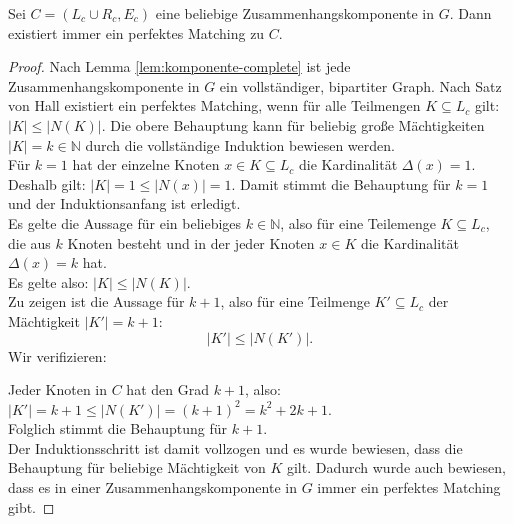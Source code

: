 \begin{lemma}\label{lem:komponente-matching}
Sei $C = (L_c \cup R_c, E_c)$ eine beliebige
Zusammenhangskomponente in $G$. Dann existiert immer ein perfektes Matching zu $C$.
\end{lemma}
\begin{proof} 
Nach Lemma \ref{lem:komponente-complete} ist jede Zusammenhangskomponente in $G$ ein vollständiger,
bipartiter Graph. Nach Satz von Hall existiert ein perfektes Matching, wenn
für alle Teilmengen $K \subseteq L_c$ gilt: $|K| \leqslant |N(K)|$.
Die obere Behauptung kann für beliebig große Mächtigkeiten $|K| = k \in \mathbb{N}$
durch die vollständige Induktion bewiesen werden.\\

\noindent
{} Für $k = 1$ hat der einzelne Knoten $x \in K \subseteq L_c$
die Kardinalität $\Delta(x) = 1$.
Deshalb gilt: $|K| = 1 \leqslant |N(x)| = 1$. Damit stimmt die Behauptung für $k = 1$ und der Induktionsanfang ist erledigt.\\

\noindent
{} Es gelte die Aussage für ein beliebiges $k \in \mathbb{N}$, also für eine Teilemenge
$K \subseteq L_c$, die aus $k$ Knoten besteht und in der jeder Knoten $x \in K$ die Kardinalität
$\Delta(x) = k$ hat.\\ Es gelte also: $|K| \leqslant |N(K)|$.\\
Zu zeigen ist die Aussage für $k + 1$, also für eine Teilmenge $K' \subseteq L_c$ der Mächtigkeit 
$|K'| = k+1$:
\[
|K'| \leqslant |N(K')|.
\] 
Wir verifizieren:

Jeder Knoten in $C$ hat den Grad $k+1$, also: $|K'| = k + 1 \leqslant |N(K')| = (k+1)^2 = k^2 + 2k + 1$.\\
Folglich stimmt die Behauptung für $k+1$.\\

Der Induktionsschritt ist damit vollzogen und es wurde bewiesen, dass die Behauptung für beliebige
Mächtigkeit von $K$ gilt.
Dadurch wurde auch bewiesen, dass es in einer Zusammenhangskomponente in $G$
 immer ein perfektes Matching gibt.
\end{proof}

